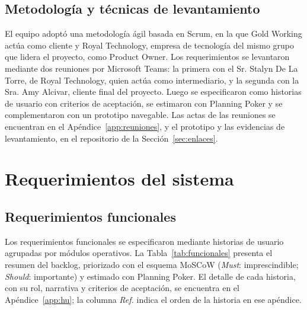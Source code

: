 \documentclass[12pt,a4paper]{article}
\begin{document}
\subsection{Metodolog\'ia y t\'ecnicas de levantamiento}
El equipo adopt\'o una metodolog\'ia \'agil basada en Scrum, en la que Gold Working act\'ua como cliente y Royal Technology, empresa de tecnolog\'ia del mismo grupo que lidera el proyecto, como Product Owner. Los requerimientos se levantaron mediante dos reuniones por Microsoft Teams: la primera con el Sr. Stalyn De La Torre, de Royal Technology, quien act\'ua como intermediario, y la segunda con la Sra. Amy Alcivar, cliente final del proyecto. Luego se especificaron como historias de usuario con criterios de aceptaci\'on, se estimaron con Planning Poker y se complementaron con un prototipo navegable. Las actas de las reuniones se encuentran en el Ap\'endice~\ref{app:reuniones}, y el prototipo y las evidencias de levantamiento, en el repositorio de la Secci\'on~\ref{sec:enlaces}.

\section{Requerimientos del sistema}

\subsection{Requerimientos funcionales}
Los requerimientos funcionales se especificaron mediante historias de usuario agrupadas por m\'odulos operativos. La Tabla~\ref{tab:funcionales} presenta el resumen del backlog, priorizado con el esquema MoSCoW (\textit{Must}: imprescindible; \textit{Should}: importante) y estimado con Planning Poker. El detalle de cada historia, con su rol, narrativa y criterios de aceptaci\'on, se encuentra en el Ap\'endice~\ref{app:hu}; la columna \textit{Ref.} indica el orden de la historia en ese ap\'endice.
\end{document}
